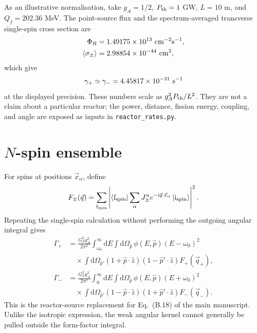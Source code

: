\documentclass[aps,prd,10pt,onecolumn,nofootinbib,amsmath,amssymb]{revtex4-1}
\newcommand{\dd}{\mathrm{d}}
\newcommand{\vev}[1]{\left\langle #1\right\rangle}
\begin{document}
As an illustrative normalisation, take \(g_A=1/2\),
\(P_{\rm th}=1\) GW, \(L=10\) m, and \(Q_f=202.36\) MeV.  The point-source
flux and the spectrum-averaged transverse single-spin cross section are
\begin{equation}
\begin{aligned}
 \Phi_R&=1.49175\times10^{13}~{\rm cm}^{-2}{\rm s}^{-1},\\
 \vev{\sigma_\pm}
 &=2.98854\times10^{-44}~{\rm cm}^2 ,
\end{aligned}
\end{equation}
which give
\begin{equation}
 \gamma_+\simeq\gamma_-
 =4.45817\times10^{-31}~{\rm s}^{-1}
\label{eq:numericgamma}
\end{equation}
at the displayed precision.  These numbers scale as
\(g_A^2P_{\rm th}/L^2\).  They are not a claim about a particular reactor;
the power, distance, fission energy, coupling, and angle are exposed as
inputs in \texttt{reactor\_rates.py}.

\section{\texorpdfstring{\(N\)}{N}-spin ensemble}
\label{sec:ensemble}

For spins at positions \(\vec x_\alpha\), define
\begin{equation}
 F_\pm(\vec q)
 =\sum_{{\rm f}_{\rm spin}}
 \left|
 \left\langle{\rm f}_{\rm spin}\right|
 \sum_\alpha J_\pm^\alpha e^{-{\rm i}\vec q\cdot\vec x_\alpha}
 \left|{\rm i}_{\rm spin}\right\rangle
 \right|^2.
\label{eq:Fgeneral}
\end{equation}
Repeating the single-spin calculation without performing the outgoing
angular integral gives
\begin{equation}
\boxed{
\begin{aligned}
 \Gamma_+
 &=\frac{G_F^2g_A^2}{2\pi^2}
 \int_{\omega_0}^\infty\dd E\int\dd\Omega_{\hat p}\,
 \phi(E,\hat p)(E-\omega_0)^2\\
 &\quad\times\int\dd\Omega_{\hat p'}
 (1+\hat p\cdot\hat z)(1-\hat p'\cdot\hat z)
 F_+(\vec q_+),\\
 \Gamma_-
 &=\frac{G_F^2g_A^2}{2\pi^2}
 \int_0^\infty\dd E\int\dd\Omega_{\hat p}\,
 \phi(E,\hat p)(E+\omega_0)^2\\
 &\quad\times\int\dd\Omega_{\hat p'}
 (1-\hat p\cdot\hat z)(1+\hat p'\cdot\hat z)
 F_-(\vec q_-).
\end{aligned}}
\label{eq:ensemblegeneral}
\end{equation}
This is the reactor-source replacement for Eq.~(B.18) of the main
manuscript.  Unlike the isotropic expression, the weak angular kernel
cannot generally be pulled outside the form-factor integral.
\end{document}

